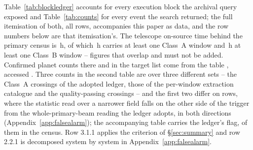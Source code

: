 Table~\ref{tab:blockledger} accounts for every execution block the archival
query exposed and Table~\ref{tab:counts} for every event the search returned;
the full itemisation of both, all \MtCountRows{} rows, accompanies this paper
as data, and the row numbers below are that itemisation's. The telescope
on-source time behind the primary census is
\StTelHours\,h, of which \StTelHoursFine\,h carries at least one Class~A
window and \StTelHoursCoarse\,h at least one Class~B window -- figures that
overlap and must not be added. Confirmed planet counts there and in the
target list come from the \SfHostCatalogue{} \SfHostTable{} table
\citep{NEA2013}, accessed \SfHostDate. Three counts in the second table are
\MtCrossA{} over three different sets -- the Class~A crossings of the adopted
ledger, those of the per-window extraction catalogue and the quality-passing
crossings -- and the first two differ on \FrNFlag{} rows, where the statistic
read over a narrower field falls on the other side of the trigger from the
whole-primary-beam reading the ledger adopts, in both directions
(Appendix~\ref{app:falsealarm}); the accompanying table carries the ledger's
flag, \MtCrossACen{} of them in the census. Row 3.1.1 applies the criterion
of \S\ref{sec:summary} and row 2.2.1 is decomposed system by system in
Appendix~\ref{app:falsealarm}.

\begin{table}
\centering
\scriptsize
\caption{\textbf{The survey ledger, part two: events, dispositions and
confirmation.} Every headline count in this paper is read from here.}
\label{tab:counts}

\end{table}

\begin{table}
\centering
\scriptsize
\caption{\textbf{The \NProjCodes{} ALMA proposals the searched blocks belong
to}, as \mbox{ADS/JAO.ALMA\#\textit{code}}. Every census block belongs to
one.\ProjCodeUnresClause}
\label{tab:projcodes}

\end{table}
